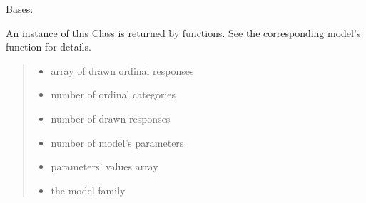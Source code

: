\documentclass[letterpaper,10pt,english]{sphinxmanual}
\begin{document}
\begin{fulllineitems}
\label{\detokenize{cubmods:cubmods.smry.CUBsample}}
\pysigstartsignatures
{}
\pysigstopsignatures
\sphinxAtStartPar
Bases: 

\sphinxAtStartPar
An instance of this Class is returned by  functions. 
See the corresponding model’s function for details.
\begin{quote}\begin{description}
\begin{itemize}
\item {} 
\sphinxAtStartPar
{} \textendash{} array of drawn ordinal responses

\item {} 
\sphinxAtStartPar
{} \textendash{} number of ordinal categories

\item {} 
\sphinxAtStartPar
{} \textendash{} number of drawn responses

\item {} 
\sphinxAtStartPar
{} \textendash{} number of model’s parameters

\item {} 
\sphinxAtStartPar
{} \textendash{} parameters’ values array

\item {} 
\sphinxAtStartPar
{} \textendash{} the model family


\end{itemize}
\end{description}
\end{quote}
\end{fulllineitems}
\end{document}
